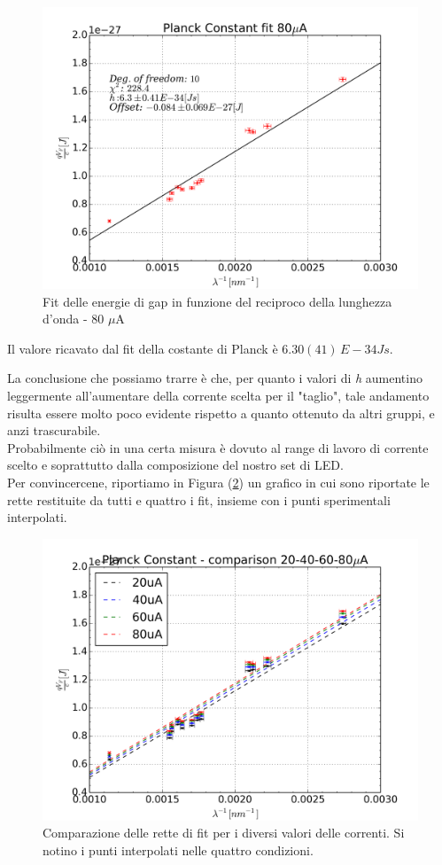 \documentclass[journal, a4paper]{IEEEtran}
\begin{document}
\begin{figure}
\centering
\includegraphics[width=0.9\linewidth]{./costante_planck_80ua}
\caption{Fit delle energie di gap in funzione del reciproco della lunghezza d'onda - 80 $\mu$A}
\label{fig:costante_planck_80ua}
\end{figure}

Il valore ricavato dal fit della costante di Planck è $6.30(41) \, E-34 \si{Js}$.

La conclusione che possiamo trarre è che, per quanto i valori di \textit{h} aumentino leggermente all'aumentare della corrente scelta per il "taglio", tale andamento risulta essere molto poco evidente rispetto a quanto ottenuto da altri gruppi, e anzi trascurabile.\\
Probabilmente ciò in una certa misura è dovuto al range di lavoro di corrente scelto e soprattutto dalla composizione del nostro set di LED.\\

Per convincercene, riportiamo in Figura (\ref{fig:costante_planck_comparison}) un grafico in cui sono riportate le rette restituite da tutti e quattro i fit, insieme con i punti sperimentali interpolati.

\begin{figure}
\centering
\includegraphics[width=0.9\linewidth]{./costante_planck_comparison}
\caption{Comparazione delle rette di fit per i diversi valori delle correnti. Si notino i punti interpolati nelle quattro condizioni.}
\label{fig:costante_planck_comparison}
\end{figure}
\end{document}
